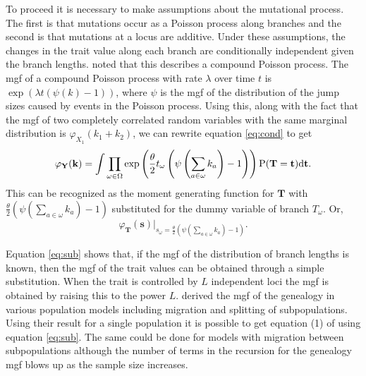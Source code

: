 To proceed it is necessary to make assumptions about the mutational process. The
first is that mutations occur as a Poisson process along branches and the second
is that mutations at a locus are additive. Under these assumptions, the changes
in the trait value along each branch are conditionally independent given the
branch lengths. \citet{Khaitovich2005} noted that this describes a compound
Poisson process. The mgf of a compound Poisson process with rate $\lambda$ over
time $t$ is $\exp(\lambda t (\psi(k)-1))$, where $\psi$ is the mgf of the
distribution of the jump sizes caused by events in the Poisson process. Using
this, along with the fact that the mgf of two completely correlated random
variables with the same marginal distribution is $\varphi_{X_1}(k_1+k_2)$, we
can rewrite equation \eqref{eq:cond} to get
\begin{equation}
  \label{eq:fullmgf}
  \varphi_{\mathbf{Y}}(\mathbf{k}) = 
  \int \prod_{\omega \in \Omega} \exp\left( \frac{\theta}{2} t_{\omega} \left( \psi\left(\sum_{a \in \omega}k_{a}\right) -1 \right)\right)
  \mathrm{P}(\mathbf{T}=\mathbf{t})\mbox{d}\mathbf{t}.
\end{equation}
This can be recognized as the moment generating function for $\mathbf{T}$ with
$\frac{\theta}{2} \left( \psi(\sum_{a \in \omega}k_{a}) -1 \right)$ substituted
for the dummy variable of branch $T_{\omega}$. Or,
\begin{equation}
  \label{eq:sub}
  \varphi_{\mathbf{T}}(\mathbf{s})\Bigr|_{s_{\omega}=\frac{\theta}{2} \left( \psi\left(\sum_{a \in \omega}k_{a}\right) -1 \right)}.
\end{equation}

Equation \eqref{eq:sub} shows that, if the mgf of the distribution of branch
lengths is known, then the mgf of the trait values can be obtained through a
simple substitution. When the trait is controlled by $L$ independent loci the
mgf is obtained by raising this to the power $L$. \citet{Lohse2011} derived the
mgf of the genealogy in various population models including migration and
splitting of subpopulations. Using their result for a single population it is
possible to get equation (1) of \citet{Schraiber2015} using equation
\eqref{eq:sub}. The same could be done for models with migration between
subpopulations although the number of terms in the recursion for the genealogy
mgf blows up as the sample size increases.


